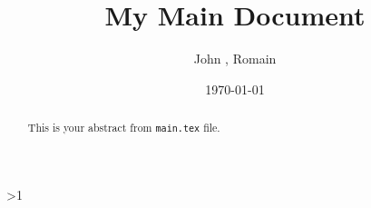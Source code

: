 \documentclass[a4paper]{article}  %
\title{My Main Document}
\author{John \famName{Doe}, Romain \famName{Noël}}
\date{\today}
\newcommand{\Pathbasebib}{\PathR/ref_RN.bib,\PathR/ref_XX.bib}%
\begin{document}

\maketitle

	\begin{abstract}
		This is your abstract from \texttt{main.tex} file.
	\end{abstract}








\ifnum\value{levelstanda}>1
	{}%
\else

	\printunsrtglossary[type=acronym]
	\printunsrtglossary[type=symbol]
\fi

\addtocounter{levelstanda}{-1}
\end{document}

